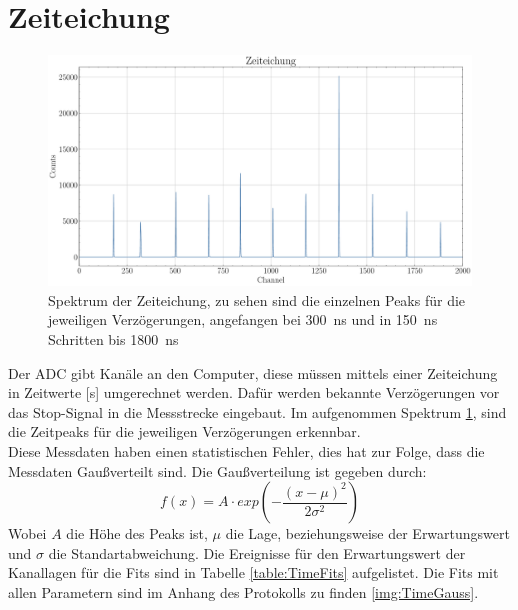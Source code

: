 \documentclass[12pt,a4paper,ngerman]{report}
\begin{document}
	\section{Zeiteichung}
	\begin{figure}[ht]
		\centering
		\includegraphics[width=\textwidth]{Bilder/zeitEich.pdf}		
		\caption[Spektrum der Zeiteichung]{Spektrum der Zeiteichung, zu sehen sind die einzelnen Peaks für die jeweiligen Verzögerungen, angefangen bei \SI{300}{\nano \s} und in \SI{150}{\nano \s} Schritten bis \SI{1800}{\nano \s}}
		\label{img:zeitEich}
	\end{figure}
	Der ADC gibt Kanäle an den Computer, diese müssen mittels einer Zeiteichung in Zeitwerte [s] umgerechnet werden. Dafür werden bekannte Verzögerungen vor das Stop-Signal in die Messstrecke eingebaut. Im aufgenommen Spektrum \ref{img:zeitEich}, sind die Zeitpeaks für die jeweiligen Verzögerungen erkennbar.\\
	Diese Messdaten haben einen statistischen Fehler, dies hat zur Folge, dass die Messdaten Gaußverteilt sind. Die Gaußverteilung ist gegeben durch:
	\begin{equation}
		f(x) = A \cdot exp\left(- \frac{(x-\mu)^2}{2 \sigma ^2}\right)
	\end{equation}
	Wobei $A$ die Höhe des Peaks ist, $\mu$ die Lage, beziehungsweise der Erwartungswert und $\sigma$ die Standartabweichung. Die Ereignisse für den Erwartungswert der Kanallagen für die Fits sind in Tabelle \ref{table:TimeFits} aufgelistet. Die Fits mit allen Parametern sind im Anhang des Protokolls zu finden \ref{img:TimeGauss}.
\end{document}
